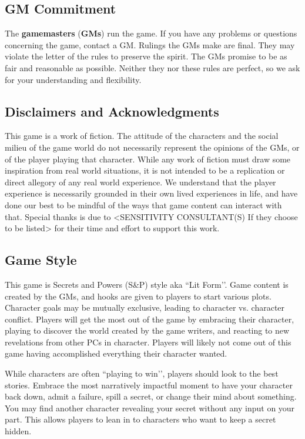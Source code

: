 \documentclass[sheet]{GL2020}
\begin{document}
\subsection{GM Commitment}
The \textbf{gamemasters} (\textbf{GMs}) run the game. If you have any problems or questions concerning the game, contact a GM. Rulings the GMs make are final.  They may violate the letter of the rules to preserve the spirit.  The GMs promise to be as fair and reasonable as possible. Neither they nor these rules are perfect, so we ask for your understanding and flexibility.

\subsection{Disclaimers and Acknowledgments}
This game is a work of fiction. The attitude of the characters and the social milieu of the game world do not necessarily represent the opinions of the GMs, or of the player playing that character. While any work of fiction must draw some inspiration from real world situations, it is not intended to be a replication or direct allegory of any real world experience. We understand that the player experience is necessarily grounded in their own lived experiences in life, and have done our best to be mindful of the ways that game content can interact with that. Special thanks is due to <SENSITIVITY CONSULTANT(S) If they choose to be listed> for their time and effort to support this work. 

\subsection{Game Style}
This game is Secrets and Powers (S\&P) style aka ``Lit Form’’. Game content is created by the GMs, and hooks are given to players to start various plots. Character goals may be mutually exclusive, leading to character vs. character conflict. Players will get the most out of the game by embracing their character, playing to discover the world created by the game writers, and reacting to new revelations from other PCs in character. Players will likely not come out of this game having accomplished everything their character wanted.

While characters are often ``playing to win’’, players should look to the best stories. Embrace the most narratively impactful moment to have your character back down, admit a failure, spill a secret, or change their mind about something. You may find another character revealing your secret without any input on your part. This allows players to lean in to characters who want to keep a secret hidden.
\end{document}
